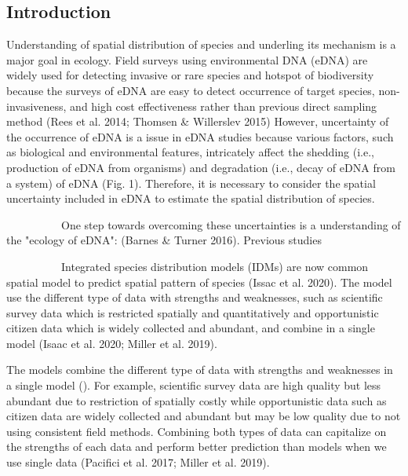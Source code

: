 \documentclass[12pt]{article}
\begin{document}
\newpage
\begin{linenumbers}
\section{Introduction}
Understanding of spatial distribution of species and underling its mechanism is a major goal in ecology. 
Field surveys using environmental DNA (eDNA) are widely used for detecting invasive or rare species and hotspot of biodiversity %
because the surveys of eDNA are easy to detect occurrence of target species, non-invasiveness, and high cost effectiveness rather than previous direct sampling method (Rees et al. 2014; Thomsen \& Willerslev 2015) %
However, uncertainty of the occurrence of eDNA is a issue in eDNA studies because various factors, such as biological and environmental features, intricately affect the shedding (i.e., production of eDNA from organisms) and degradation (i.e., decay of eDNA from a system) of eDNA (Fig. 1). Therefore, it is necessary to consider the spatial uncertainty included in eDNA to estimate the spatial distribution of species.



\ \ \ \ \ \ \ \ \ \ 
One step towards overcoming these uncertainties is a understanding of the "ecology of eDNA":  (Barnes \& Turner 2016). Previous studies

\ \ \ \ \ \ \ \ \ \ 
Integrated species distribution models (IDMs) are now common spatial model to predict spatial pattern of species (Issac et al. 2020).
The model use the different type of data with strengths and weaknesses, such as scientific survey data which is restricted spatially and quantitatively and opportunistic citizen data which is widely collected and abundant, and combine in a single model (Isaac et al. 2020; Miller et al. 2019).

The models combine the different type of data with strengths and weaknesses in a single model ().
For example, scientific survey data are high quality but less abundant due to restriction of spatially costly while opportunistic data such as citizen data are widely collected and abundant but may be low quality due to not using consistent field methods.
Combining both types of data can capitalize on the strengths of each data and perform better prediction than models when we use single data (Pacifici et al. 2017; Miller et al. 2019).




\end{linenumbers}
\end{document}
